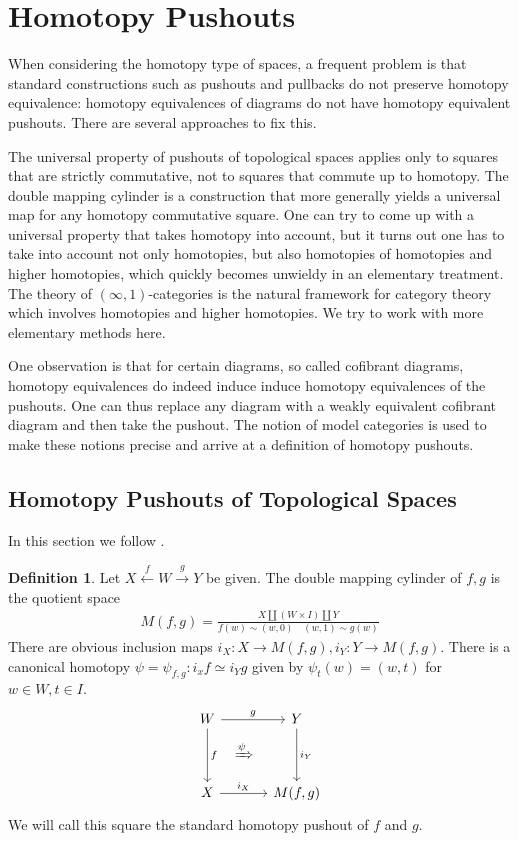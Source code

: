 \documentclass{scrartcl}
\theoremstyle{plain}
\theoremstyle{definition}
\newtheorem{definition}[theorem]{Definition}
\renewcommand{\coprod}{\mathbin{\amalg}}
\begin{document}
\section{Homotopy Pushouts}

When considering the homotopy type of spaces, a frequent problem is that standard constructions such as pushouts and pullbacks do not preserve homotopy equivalence: homotopy equivalences of diagrams do not have homotopy equivalent pushouts. There are several approaches to fix this. 

The universal property of pushouts of topological spaces applies only to squares that are strictly commutative, not to squares that commute up to homotopy. The double mapping cylinder is a construction that more generally yields a universal map for any homotopy commutative square. One can try to come up with a universal property that takes homotopy into account, but it turns out one has to take into account not only homotopies, but also homotopies of homotopies and higher homotopies, which quickly becomes unwieldy in an elementary treatment. The theory of $(\infty, 1)$-categories is the natural framework for category theory which involves homotopies and higher homotopies. We try to work with more elementary methods here.

One observation is that for certain diagrams, so called cofibrant diagrams, homotopy equivalences do indeed induce induce homotopy equivalences of the pushouts. One can thus replace any diagram with a weakly equivalent cofibrant diagram and then take the pushout. The notion of model categories is used to make these notions precise and arrive at a definition of homotopy pushouts. 

\subsection{Homotopy Pushouts of Topological Spaces}


In this section we follow \cite[1.2]{may2011more}.  
\begin{definition}
    Let $X\xleftarrow{f}W\xrightarrow{g}Y$ be given. The double mapping cylinder of $f, g$ is the quotient space
    \begin{align*}
        M(f, g) = \frac{X\coprod(W\times I)\coprod Y}{f(w)\sim (w,0)\quad (w, 1)\sim g(w)}
    \end{align*}
    There are obvious inclusion maps $i_X\colon X\to M(f, g), i_Y\colon Y\to M(f, g)$. There is a canonical homotopy $\psi=\psi_{f, g}\colon i_xf\simeq i_Yg$ given by $\psi_t(w) = (w, t)$ for $w\in W, t\in I$. 
    \begin{equation}
        \begin{tikzcd}[column sep=.2cm, row sep=.2cm]
            W \arrow[rr,"g"]\arrow[dd,"f"] && Y \arrow[dd, "i_Y"] \\
            & \xRightarrow{\psi} & \\
            X \arrow[rr, "i_X"] && M(f, g)
        \end{tikzcd}
    \end{equation}
    We will call this square the standard homotopy pushout of $f$ and $g$.
\end{definition}
\end{document}

